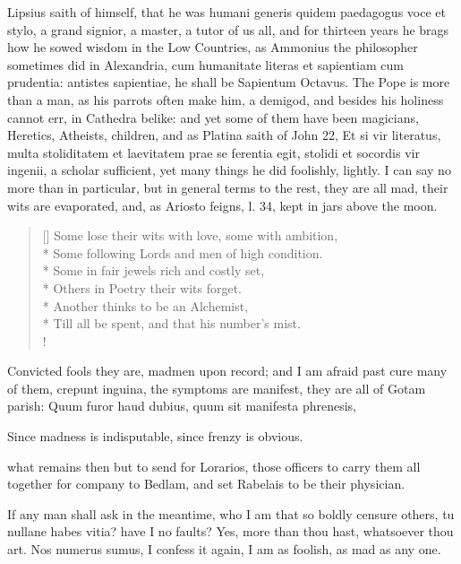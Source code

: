 {Lipsius saith of himself, that he was humani generis quidem
paedagogus voce et stylo, a grand signior, a master, a tutor of us all,
and for thirteen years he brags how he sowed wisdom in the Low
Countries, as Ammonius the philosopher sometimes did in Alexandria,
cum humanitate literas et sapientiam cum prudentia: antistes
sapientiae, he shall be Sapientum Octavus. The Pope is more than a man,
as his parrots often make him, a demigod, and besides his holiness
cannot err, in Cathedra belike: and yet some of them have been
magicians, Heretics, Atheists, children, and as Platina saith of John
22, Et si vir literatus, multa stoliditatem et laevitatem prae se
ferentia egit, stolidi et socordis vir ingenii, a scholar sufficient,
yet many things he did foolishly, lightly. I can say no more than in
particular, but in general terms to the rest, they are all mad, their
wits are evaporated, and, as Ariosto feigns, l. 34, kept in jars above
the moon.

\settowidth{\versewidth}{Till all be spent, and that his number's mist.}
\begin{verse}[\versewidth]
Some lose their wits with love, some with ambition,\\*
Some following Lords and men of high condition.\\*
Some in fair jewels rich and costly set,\\*
Others in Poetry their wits forget.\\*
Another thinks to be an Alchemist,\\*
Till all be spent, and that his number's mist.\\!
\end{verse}

Convicted fools they are, madmen upon record; and I am afraid past cure
many of them, crepunt inguina, the symptoms are manifest, they are
all of Gotam parish:
Quum furor haud dubius, quum sit manifesta phrenesis,

Since madness is indisputable, since frenzy is obvious.

what remains then but to send for Lorarios, those officers to
carry them all together for company to Bedlam, and set Rabelais to be
their physician.

If any man shall ask in the meantime, who I am that so boldly censure
others, tu nullane habes vitia? have I no faults? Yes, more than
thou hast, whatsoever thou art. Nos numerus sumus, I confess it again,
I am as foolish, as mad as any one.

}
